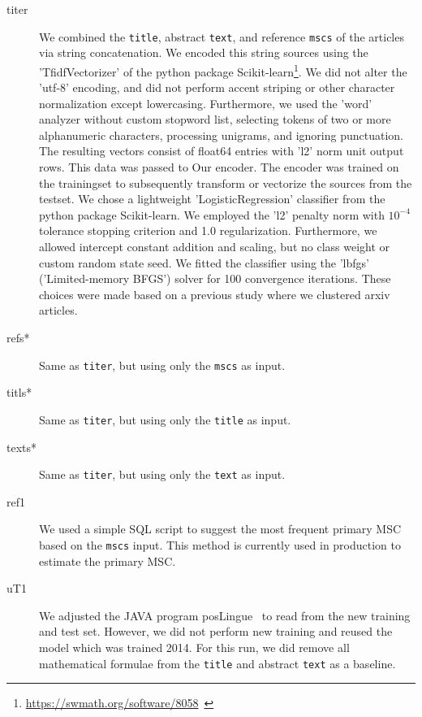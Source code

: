 \begin{description}
  \item[titer] We combined the \texttt{title}, abstract \texttt{text}, and reference \texttt{mscs} of the articles via string concatenation.
  We encoded this string sources using the 'TfidfVectorizer' of the python package Scikit-learn\footnote{\url{https://swmath.org/software/8058}~\cite{swSciKit}}. We did not alter the 'utf-8' encoding, and did not perform accent striping or other character normalization except lowercasing. Furthermore, we used the 'word' analyzer without custom stopword list, selecting tokens of two or more alphanumeric characters, processing unigrams, and ignoring punctuation. The resulting vectors consist of float64 entries with 'l2' norm unit output rows. This data was passed to Our encoder. The encoder was trained on the trainingset to subsequently transform or vectorize the sources from the testset.  We chose a lightweight 'LogisticRegression' classifier from the python package Scikit-learn. We employed the 'l2' penalty norm with $10^{-4}$ tolerance stopping criterion and 1.0 regularization. Furthermore, we allowed intercept constant addition and scaling, but no class weight or custom random state seed. We fitted the classifier using the 'lbfgs' ('Limited-memory BFGS') solver for 100 convergence iterations. These choices were made based on a previous study where we clustered arxiv articles.
  \item[refs*] Same as \texttt{titer}, but using only the \texttt{mscs} as input.
  \item[titls*] Same as \texttt{titer}, but using only the \texttt{title} as input.
  \item[texts*] Same as \texttt{titer}, but using only the \texttt{text} as input.
  \item[ref1] We used a simple SQL script to suggest the most frequent primary MSC based on the \texttt{mscs} input. This method is currently used in production to estimate the primary MSC.
  \item[uT1] We adjusted the JAVA program posLingue~\cite{SchonebergS14} to read from the new training and test set. However, we did not perform new training and reused the model which was trained 2014. For this run, we did remove all mathematical formulae from the \texttt{title} and abstract \texttt{text} as a baseline.

\end{description}
